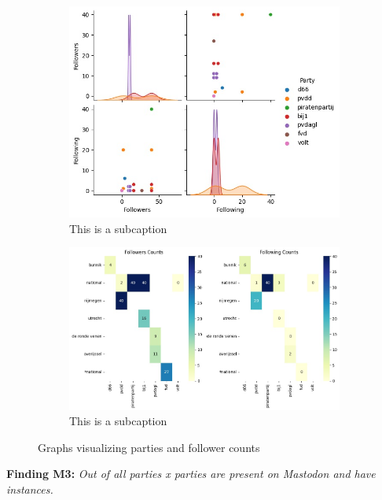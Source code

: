 \begin{figure}[!]
  \centering
  \begin{subfigure}[h]{.49\linewidth}
    \includegraphics[width=\textwidth]{media/parties-following-counts.jpeg}
    \captionsetup{justification=centering}
    \caption{This is a subcaption}
    \label{fig:partyfollowers}
  \end{subfigure}
  \begin{subfigure}[h]{.49\linewidth}
      \captionsetup{justification=centering}
      \includegraphics[width=\textwidth]{media/parties-following-region-counts.jpeg}
      \caption{This is a subcaption}
      \label{fig:partyfollowingregions}
  \end{subfigure}
  \caption{Graphs visualizing parties and follower counts}
  \label{fig:partyfollowerstotal}
\end{figure}


\textbf{Finding M3:} \textit{Out of all parties x parties are present on Mastodon and have instances.}
